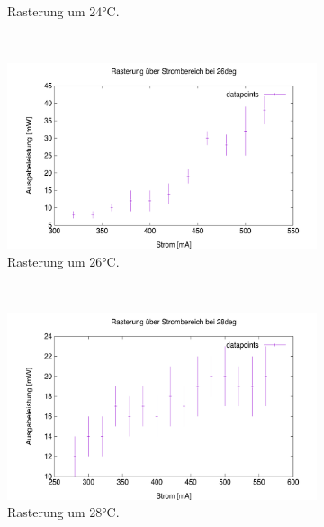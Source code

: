 \documentclass[../../main.tex]{subfiles}
\begin{document}
\begin{figure}
\begin{subfigure}[t]{0.45\textwidth}
            \caption{Rasterung um $24\si{\celsius}$.}
            \label{fig:1-2:Rasterung24deg}
        \end{subfigure}
        \
        \begin{subfigure}[t]{0.45\textwidth}
            \centering
            \includegraphics[width=\textwidth]{../../Bilddateien/1-2/Rasterung_26deg.png}
            \caption{Rasterung um $26\si{\celsius}$.}
            \label{fig:1-2:Rasterung26deg}
        \end{subfigure}
        \
        \begin{subfigure}[t]{0.45\textwidth}
            \centering
            \includegraphics[width=\textwidth]{../../Bilddateien/1-2/Rasterung_28deg.png}
            \caption{Rasterung um $28\si{\celsius}$.}
            \label{fig:1-2:Rasterung28deg}
        \end{subfigure}
        \
        \begin{subfigure}[t]{0.45\textwidth}
            \centering

\end{subfigure}
\end{figure}
\end{document}
